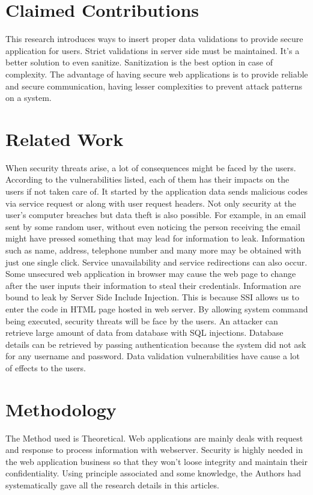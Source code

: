 \documentclass[a4paper,12pt]{article}
\begin{document}
 
\section{Claimed Contributions}
This research introduces ways to insert proper data validations to provide secure application for users. Strict validations in server side must be maintained. It’s a better solution to even sanitize. Sanitization is the best option in case of complexity. The advantage of having secure web applications is to provide reliable and secure communication, having lesser complexities to prevent attack patterns on a system.
\section{Related Work}
When security threats arise, a lot of consequences might be faced by the users. According to the vulnerabilities listed, each of them has their impacts on the users if not taken care of. It started by the application data sends malicious codes via service request or along with user request headers. Not only security at the user’s computer breaches but data theft is also possible. For example, in an email sent by some random user, without even noticing the person receiving the email might have pressed something that may lead for information to leak. Information such as name, address, telephone number and many more may be obtained with just one single click. Service unavailability and service redirections can also occur. Some unsecured web application in browser may cause the web page to change after the user inputs their information to steal their credentials. Information are bound to leak by Server Side Include Injection. This is because SSI allows us to enter the code in HTML page hosted in web server. By allowing system command being executed, security threats will be face by the users. An attacker can retrieve large amount of data from database with SQL injections. Database details can be retrieved by passing authentication because the system did not ask for any username and password. Data validation vulnerabilities have cause a lot of effects to the users.
\section{Methodology}
The Method used is Theoretical. Web applications are mainly deals with request and response to process information with webserver. Security is highly needed in the web application business so that they won't loose integrity and maintain their confidentiality. Using principle associated and some knowledge, the Authors had systematically gave all the research details in this articles.
\end{document}
